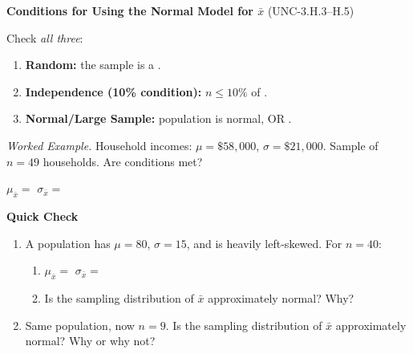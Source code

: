 \documentclass[10pt]{article}
\begin{document}
\begin{notesbox}
\textbf{Conditions for Using the Normal Model for $\bar{x}$} (UNC-3.H.3--H.5)

Check \emph{all three}:
\begin{enumerate}
  \item \textbf{Random:} the sample is a \blank{2.5in}.
  \item \textbf{Independence (10\% condition):} $n \le 10\%$ of \blank{1.5in}.
  \item \textbf{Normal/Large Sample:} population is normal, OR \blank{0.6in}.
\end{enumerate}

\medskip
\textit{Worked Example.} Household incomes: $\mu = \$58{,}000$, $\sigma = \$21{,}000$.
Sample of $n = 49$ households. Are conditions met?


$\mu_{\bar{x}} = $ \blank{1in} \hspace{1cm} $\sigma_{\bar{x}} = $ \blank{1in}
\end{notesbox}

\begin{practicebox}
\textbf{Quick Check}
\begin{enumerate}
  \item A population has $\mu = 80$, $\sigma = 15$, and is heavily left-skewed. For $n = 40$:
        \begin{enumerate}[label=\alph*.]
          \item $\mu_{\bar{x}} = $ \blank{0.6in} \hspace{1cm} $\sigma_{\bar{x}} = $ \blank{0.8in}
          \item Is the sampling distribution of $\bar{x}$ approximately normal? Why?
        \end{enumerate}
  \item Same population, now $n = 9$. Is the sampling distribution of $\bar{x}$ approximately
        normal? Why or why not?
\end{enumerate}
\end{practicebox}
\end{document}
